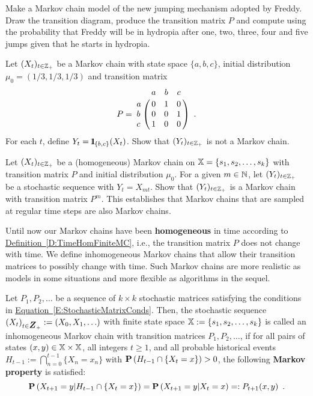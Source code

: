 {\begin{exercise}
Make a Markov chain model of the new jumping mechanism adopted by Freddy.  Draw the transition diagram, produce the transition matrix $P$ and compute using \Matlab the probability that Freddy will be in hydropia after one, two, three, four and five jumps given that he starts in hydropia.
\end{exercise}

\begin{exercise}\label{Exr:NonMarkovProjection1}
Let $(X_t)_{t\in\mathbb{Z}_+}$ be a Markov chain with state space $\{a,b,c\}$, initial distribution $\mu_0=(1/3,1/3,1/3)$ and transition matrix 
$$P = 
\bordermatrix{~ & a & b & c \cr
a & 0 & 1 & 0\cr
b & 0 & 0 & 1\cr
c & 1 & 0 & 0} \enspace .
$$
For each $t$, define $Y_t = {1}\mspace{-11 mu}{1}_{\{b,c\}}(X_t)$.  Show that $(Y_t)_{t\in\mathbb{Z}_+}$ is not a Markov chain.
\end{exercise}

\begin{exercise}\label{Exr:RegularSampledChainIsMarkov}
Let $(X_t)_{t\in\mathbb{Z}_+}$ be a (homogeneous) Markov chain on $\mathbb{X}=\{s_1,s_2,\ldots,s_k\}$ with transition matrix $P$ and initial distribution $\mu_0$.  For a given $m \in \mathbb{N}$, let $(Y_t)_{t\in\mathbb{Z}_+}$ be a stochastic sequence with $Y_t = X_{mt}$.  Show that $(Y_t)_{t\in\mathbb{Z}_+}$ is a Markov chain with transition matrix $P^m$.  This establishes that Markov chains that are sampled at regular time steps are also Markov chains.
\end{exercise}


Until now our Markov chains have been {\bf  homogeneous} in time according to \hyperref[D:TimeHomFiniteMC]{Definition~\ref*{D:TimeHomFiniteMC}}, i.e., the transition matrix $P$ does not change with time.  We define inhomogeneous Markov chains that allow their transition matrices to possibly change with time.  Such Markov chains are more realistic as models in some situations and more flexible as algorithms in the sequel.

\begin{definition}\label{D:TimeInhomFiniteMC}
Let $P_1,P_2,\ldots$ be a sequence of $k \times k$ stochastic matrices satisfying the conditions in \hyperref[E:StochasticMatrixConds]{Equation~\ref*{E:StochasticMatrixConds}}.  Then, the stochastic sequence $\left( X_t \right)_{t \in \Z_+} := (X_0,X_1,\ldots)$ with finite state space $\mathbb{X} := \{s_1,s_2,\ldots,s_k\}$ is called an inhomogeneous Markov chain with transition matrices $P_1,P_2,\ldots$, if for all pairs of states $(x,y) \in \mathbb{X} \times \mathbb{X}$, all integers $t \geq 1$, and all probable historical events $H_{t-1} := \bigcap_{n=0}^{t-1} \{ X_n = x_n \}$ with $\mathbf{P}\left(H_{t-1} \cap \{X_t = x\} \right) > 0$, the following {\bf Markov property} is satisfied: 
\begin{equation}\label{E:InHomFiniteMarkovProperty}
\mathbf{P}\left(X_{t+1} = y | H_{t-1} \cap \{X_t = x\} \right)=\mathbf{P}\left(X_{t+1} = y | X_t = x \right) =: P_{t+1}(x,y) \enspace .
\end{equation}
\end{definition}

}
